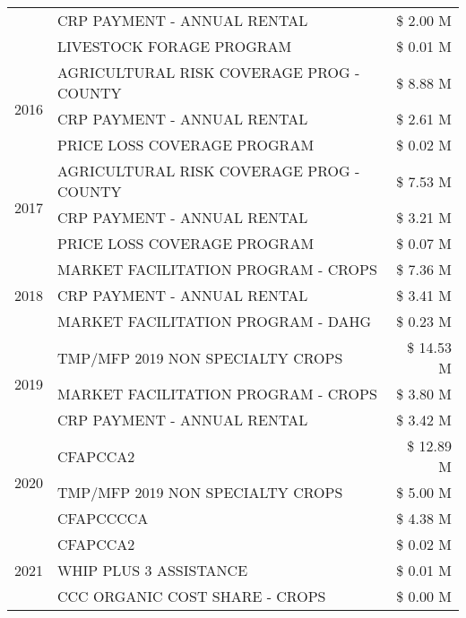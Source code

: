 \begin{tabular}{llr}
 & CRP PAYMENT - ANNUAL RENTAL & \$ 2.00 M \\
 & LIVESTOCK FORAGE PROGRAM & \$ 0.01 M \\
\cline{1-3}
\multirow[t]{3}{*}{2016} & AGRICULTURAL RISK COVERAGE PROG - COUNTY & \$ 8.88 M \\
 & CRP PAYMENT - ANNUAL RENTAL & \$ 2.61 M \\
 & PRICE LOSS COVERAGE PROGRAM & \$ 0.02 M \\
\cline{1-3}
\multirow[t]{3}{*}{2017} & AGRICULTURAL RISK COVERAGE PROG - COUNTY & \$ 7.53 M \\
 & CRP PAYMENT - ANNUAL RENTAL & \$ 3.21 M \\
 & PRICE LOSS COVERAGE PROGRAM & \$ 0.07 M \\
\cline{1-3}
\multirow[t]{3}{*}{2018} & MARKET FACILITATION PROGRAM - CROPS & \$ 7.36 M \\
 & CRP PAYMENT - ANNUAL RENTAL & \$ 3.41 M \\
 & MARKET FACILITATION PROGRAM - DAHG & \$ 0.23 M \\
\cline{1-3}
\multirow[t]{3}{*}{2019} & TMP/MFP 2019 NON SPECIALTY CROPS & \$ 14.53 M \\
 & MARKET FACILITATION PROGRAM - CROPS & \$ 3.80 M \\
 & CRP PAYMENT - ANNUAL RENTAL & \$ 3.42 M \\
\cline{1-3}
\multirow[t]{3}{*}{2020} & CFAPCCA2 & \$ 12.89 M \\
 & TMP/MFP 2019 NON SPECIALTY CROPS & \$ 5.00 M \\
 & CFAPCCCCA & \$ 4.38 M \\
\cline{1-3}
\multirow[t]{3}{*}{2021} & CFAPCCA2 & \$ 0.02 M \\
 & WHIP PLUS 3 ASSISTANCE & \$ 0.01 M \\
 & CCC ORGANIC COST SHARE - CROPS & \$ 0.00 M \\
\cline{1-3}
\bottomrule
\end{tabular}

